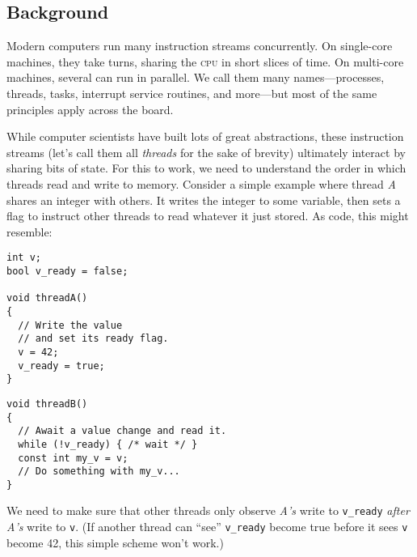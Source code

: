 \documentclass[fontsize=\bodyfontsize, numbers=endperiod]{scrartcl}
\newcommand{\codesize}{\fontsize{\bodyfontsize}{\bodybaselineskip}}
\newenvironment{colfigure}
  {\par\vspace{1\baselineskip minus 0.5\baselineskip}\noindent\minipage{\linewidth}}
  {\endminipage\vspace{1\baselineskip minus 0.7\baselineskip}}
\begin{document}
\ifebook
\else
\begin{multicols}{2}
\fi
\section{Background}
\label{background}

Modern computers run many instruction streams concurrently.
On single-core machines, they take turns,
sharing the \textsc{cpu} in short slices of time.
On multi-core machines, several can run in parallel.
We call them many names---processes, threads, tasks,
interrupt service routines, and more---but most of the same principles apply
across the board.

While computer scientists have built lots of great abstractions,
these instruction streams
(let's call them all \emph{threads} for the sake of brevity)
ultimately interact by sharing bits of state.
For this to work, we need to understand the order in which
threads read and write to memory.
Consider a simple example where thread \textit{A} shares
an integer with others.
It writes the integer to some variable,
then sets a flag to instruct other threads to read whatever it just stored.
As code, this might resemble:
\begin{colfigure}
\begin{verbatim}
int v;
bool v_ready = false;

void threadA()
{
  // Write the value
  // and set its ready flag.
  v = 42;
  v_ready = true;
}
\end{verbatim}
\end{colfigure}
\begin{colfigure}
\begin{verbatim}
void threadB()
{
  // Await a value change and read it.
  while (!v_ready) { /* wait */ }
  const int my_v = v;
  // Do something with my_v...
}
\end{verbatim}
\end{colfigure}
We need to make sure that other threads only observe \textit{A's} write to
\texttt{v\_ready}
\emph{after A's} write to \texttt{v}.
(If another thread can ``see'' \texttt{v\_ready} become true before it sees
\texttt{v} become 42, this simple scheme won't work.)


\end{multicols}
\end{document}
